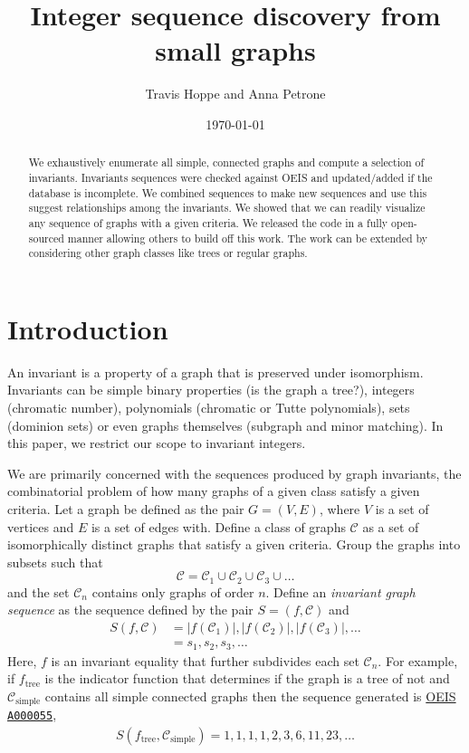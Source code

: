 \documentclass[12pt]{article}
\newcommand{\OEIS}[1]
{\href{https://oeis.org/#1}{OEIS \texttt{#1}}}
\begin{document}
\title{Integer sequence discovery from small graphs}
\author{Travis Hoppe and Anna Petrone}
\date{\today}
\maketitle

\begin{abstract}
We exhaustively enumerate all simple, connected graphs and compute a selection of invariants. 
Invariants sequences were checked against OEIS and updated/added if the database is incomplete.
We combined sequences to make new sequences and use this suggest relationships among the invariants.
We showed that we can readily visualize any sequence of graphs with a given criteria.
We released the code in a fully open-sourced manner allowing others to build off this work.
The work can be extended by considering other graph classes like trees or regular graphs.
\end{abstract}

\section{Introduction}

An invariant is a property of a graph that is preserved under isomorphism. 
Invariants can be simple binary properties (is the graph a tree?), integers (chromatic number), polynomials (chromatic or Tutte polynomials), sets (dominion sets) or even graphs themselves (subgraph and minor matching).
In this paper, we restrict our scope to invariant integers.

We are primarily concerned with the sequences produced by graph invariants, the combinatorial problem of how many graphs of a given class satisfy a given criteria.
Let a graph be defined as the pair $G = (V,E)$, where $V$ is a set of vertices and $E$ is a set of edges with. 
Define a class of graphs $\mathcal{C}$ as a set of isomorphically distinct graphs that satisfy a given criteria.
Group the graphs into subsets such that
\begin{equation}
\mathcal{C} = \mathcal{C}_1 \cup \mathcal{C}_2 \cup \mathcal{C}_3 \cup \ldots
\end{equation}
and the set $\mathcal{C}_n$ contains only graphs of order $n$.
Define an \textit{invariant graph sequence} as the sequence defined by the pair $S = (f, \mathcal{C})$ and 
\begin{align}
S(f, \mathcal{C}) 
&= |f(\mathcal{C}_1)|, |f(\mathcal{C}_2)|, |f(\mathcal{C}_3)|, \ldots  \\
&= s_1, s_2, s_3, \ldots
\end{align}
%
Here, $f$ is an invariant equality that further subdivides each set $\mathcal{C}_n$. 
For example, if $f_\text{tree}$ is the indicator function that determines if the graph is a tree of not and $\mathcal{C}_\text{simple}$ contains all simple connected graphs then the sequence generated is \OEIS{A000055},
\begin{align}
S(f_\text{tree}, \mathcal{C}_\text{simple}) = 1, 1, 1, 1, 2, 3, 6, 11, 23, \ldots
\end{align}
\end{document}
